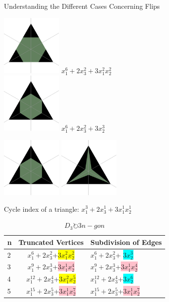 \documentclass{beamer}
\begin{document}
\begin{frame}{Understanding the Different Cases Concerning Flips}

\includegraphics[width=3cm]{img/claire/newtriangle_copya.jpg}
$x_1^6+2x_3^2+3x_1^2x_2^2$\\
\includegraphics[width=3cm]{img/claire/newtriangle_copy1.jpg}
$x_1^6+2x_3^2+ 3x_2^3$\\
\end{frame}

\begin{frame}
\includegraphics[width=3cm]{img/claire/newtriangle_copy1.jpg}
\mapsto
\includegraphics[width=3cm]{img/claire/newtriangle_copyb.jpg}
\end{frame}

\begin{frame}
Cycle index of a triangle:
$x_1^3+2x_3^1+3x_1^1 x_2^1$\\

\begin{table}
\centering
\begin{tabular}{l|c|l}
n & Truncated Vertices & Subdivision of Edges\\ \hline
2 & $x_1^6+2x_3^2$+\colorbox{yellow}{$3x_1^2x_2^2$} & $x_1^6+2x_3^2$+ \colorbox{cyan}{$3x_2^3$}\\
3 & $x_1^9+2x_3^3$+\colorbox{pink}{$3x_1^1x_2^4$}  &  $x_1^9+2x_3^3$+\colorbox{pink}{$3x_1^1x_2^4$}\\
4 & $x_1^12+2x_3^4$+\colorbox{yellow}{$3x_1^2x_2^5$} & $x_1^12+2x_3^4$+\colorbox{cyan}{$3x_2^6$}\\
5& $x_1^15+2x_3^5$+\colorbox{pink}{$3x_1^1x_2^7$} & $x_1^15+2x_3^5$+\colorbox{pink}{$3x_1^1x_2^7$}\\
\end{tabular}
\caption{$D_3 \circlearrowright 3n-gon$}
\end{table}
\end{frame}
\end{document}
